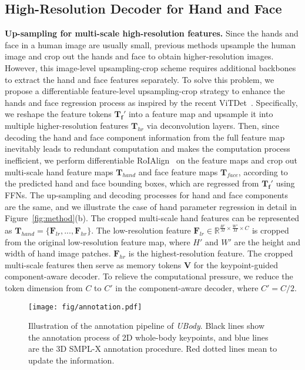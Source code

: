 \documentclass[10pt,twocolumn,letterpaper]{article}
\newcommand{\dataname}{\emph{UBody}\xspace}
\begin{document}
\subsection{High-Resolution Decoder for Hand and Face}
\label{sec:method_3}
\noindent \textbf{Up-sampling for multi-scale high-resolution features.}
Since the hands and face in a human image are usually small, previous methods upsample the human image and crop out the hands and face to obtain higher-resolution images. However, this image-level upsampling-crop scheme requires additional backbones to extract the hand and face features separately. 
To solve this problem, we propose a differentiable feature-level upsampling-crop strategy to enhance the hands and face regression process as inspired by the recent ViTDet~\cite{Li2022vitdet}.
Specifically, we reshape the feature tokens $\mathbf{T_f}'$ into a feature map and upsample it into multiple higher-resolution features $\mathbf{T}_{hr}$ via deconvolution layers. 
Then, since decoding the hand and face component information from the full feature map inevitably leads to redundant computation and makes the computation process inefficient, we perform differentiable RoIAlign~\cite{He_2017_maskrcnn} on the feature maps and crop out multi-scale hand feature maps $\mathbf{T}_{hand}$ and face feature maps $\mathbf{T}_{face}$, according to the predicted hand and face bounding boxes, which are regressed from  $\mathbf{T_f}'$ using FFNs. 
The up-sampling and decoding processes for hand and face components are the same, and we illustrate the case of hand parameter regression in detail in Figure~\ref{fig:method}(b).
The cropped multi-scale hand features can be represented as $\mathbf{T}_{hand}=\{\mathbf{F}_{lr}, ..., \mathbf{F}_{hr}\}$. The low-resolution feature $\mathbf{F}_{lr} \in \mathbb{R}^{\frac{H'}{M} \times \frac{W'}{M} \times C}$ is cropped from the original low-resolution feature map, where $H'$ and $W'$ are the height and width of hand image patches. $\mathbf{F}_{hr}$ is the highest-resolution feature. The cropped multi-scale features then serve as memory tokens $\mathbf{V}$ for the keypoint-guided component-aware decoder.
To relieve the computational pressure, we reduce the token dimension from $C$ to $C'$ in the component-aware decoder, where $C' = C/2$. 

\begin{figure*}[h]
\centering
\texttt{[image: fig/annotation.pdf]}
\vspace{-0.3cm}
\caption{
Illustration of the annotation pipeline of \dataname. Black lines show the annotation process of 2D whole-body keypoints, and blue lines are the 3D SMPL-X annotation procedure. Red dotted lines mean to update the information.
}
\label{fig:ubody_annotation}
\vspace{-0.3cm}
\end{figure*}
\end{document}
